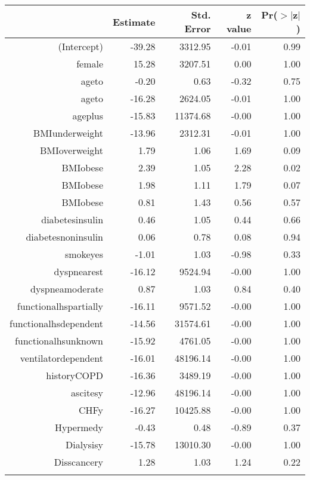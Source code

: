 \bigskip\bigskip
\centering
\begin{tabular}{rrrrr}
  \hline
 & Estimate & Std. Error & z value & Pr($>$$|$z$|$) \\ 
  \hline
(Intercept) & -39.28 & 3312.95 & -0.01 & 0.99 \\ 
  female & 15.28 & 3207.51 & 0.00 & 1.00 \\ 
  age\-65\-to\-74 & -0.20 & 0.63 & -0.32 & 0.75 \\ 
  age\-75\-to\-84 & -16.28 & 2624.05 & -0.01 & 1.00 \\ 
  age\-85\-plus & -15.83 & 11374.68 & -0.00 & 1.00 \\ 
  BMI\-underweight & -13.96 & 2312.31 & -0.01 & 1.00 \\ 
  BMI\-overweight & 1.79 & 1.06 & 1.69 & 0.09 \\ 
  BMI\-obese\-1 & 2.39 & 1.05 & 2.28 & 0.02 \\ 
  BMI\-obese\-2 & 1.98 & 1.11 & 1.79 & 0.07 \\ 
  BMI\-obese\-3 & 0.81 & 1.43 & 0.56 & 0.57 \\ 
  diabetes\-insulin & 0.46 & 1.05 & 0.44 & 0.66 \\ 
  diabetes\-noninsulin & 0.06 & 0.78 & 0.08 & 0.94 \\ 
  smoke\-yes & -1.01 & 1.03 & -0.98 & 0.33 \\ 
  dyspnea\-rest & -16.12 & 9524.94 & -0.00 & 1.00 \\ 
  dyspnea\-moderate & 0.87 & 1.03 & 0.84 & 0.40 \\ 
  functional\-hs\-partially & -16.11 & 9571.52 & -0.00 & 1.00 \\ 
  functional\-hs\-dependent & -14.56 & 31574.61 & -0.00 & 1.00 \\ 
  functional\-hs\-unknown & -15.92 & 4761.05 & -0.00 & 1.00 \\ 
  ventilator\-dependent & -16.01 & 48196.14 & -0.00 & 1.00 \\ 
  history\-COPD & -16.36 & 3489.19 & -0.00 & 1.00 \\ 
  ascites\-y & -12.96 & 48196.14 & -0.00 & 1.00 \\ 
  CHF\-y & -16.27 & 10425.88 & -0.00 & 1.00 \\ 
  Hyper\-med\-y & -0.43 & 0.48 & -0.89 & 0.37 \\ 
  Dialysis\-y & -15.78 & 13010.30 & -0.00 & 1.00 \\ 
  Diss\-cancer\-y & 1.28 & 1.03 & 1.24 & 0.22 \\ 
$$
\end{tabular}

